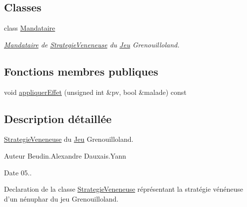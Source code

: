 \subsection*{Classes}
\begin{DoxyCompactItemize}
\item 
class \hyperlink{classgrenouilloland_1_1StrategieVeneneuse_1_1Mandataire}{Mandataire}
\begin{DoxyCompactList}\small\item\em \hyperlink{classgrenouilloland_1_1StrategieVeneneuse_1_1Mandataire}{Mandataire} de \hyperlink{classgrenouilloland_1_1StrategieVeneneuse}{Strategie\-Veneneuse} du \hyperlink{classgrenouilloland_1_1Jeu}{Jeu} Grenouilloland. \end{DoxyCompactList}\end{DoxyCompactItemize}
\subsection*{Fonctions membres publiques}
\begin{DoxyCompactItemize}
\item 
void \hyperlink{classgrenouilloland_1_1StrategieVeneneuse_a13de8092ed7e5561cf5833693deaf662}{appliquer\-Effet} (unsigned int \&pv, bool \&malade) const 
\end{DoxyCompactItemize}


\subsection{Description détaillée}
\hyperlink{classgrenouilloland_1_1StrategieVeneneuse}{Strategie\-Veneneuse} du \hyperlink{classgrenouilloland_1_1Jeu}{Jeu} Grenouilloland. 

\begin{DoxyAuthor}{Auteur}
Beudin.\-Alexandre Dauxais.\-Yann 
\end{DoxyAuthor}
\begin{DoxyDate}{Date}
05..
\end{DoxyDate}
Declaration de la classe \hyperlink{classgrenouilloland_1_1StrategieVeneneuse}{Strategie\-Veneneuse} réprésentant la stratégie vénéneuse d'un nénuphar du jeu Grenouilloland. 

